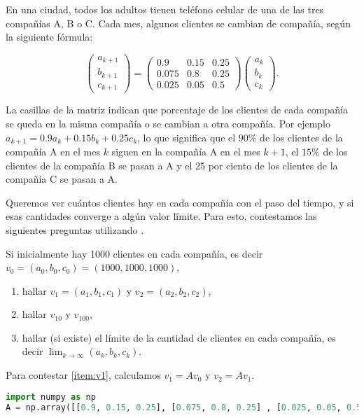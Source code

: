 \begin{ejemplo}
En una ciudad, todos los adultos tienen teléfono celular de una de las
tres compañías A, B o C. Cada mes, algunos clientes se cambian de
compañía, según la siguiente fórmula:

$$
\begin{pmatrix} a_{k+1} \\ b_{k+1} \\ c_{k+1} \end{pmatrix} =
\begin{pmatrix} 0.9 & 0.15 & 0.25 \\ 0.075 & 0.8 & 0.25 \\ 0.025 & 0.05 & 0.5 \end{pmatrix}
\begin{pmatrix} a_{k} \\ b_{k} \\ c_{k} \end{pmatrix}.
$$

La casillas de la matriz indican que porcentaje de los clientes de
cada compañía se queda en la misma compañía o se cambian a otra
compañía.  Por ejemplo $a_{k+1} = 0.9 a_k + 0.15 b_k + 0.25 c_k$, lo que significa que
el $90\%$ de los clientes de la compañía A en el mes
$k$ siguen en la compañía A en el mes $k+1$, el $15\%$ de los clientes de la compañía B se pasan a A y el 25 por ciento de los clientes de la compañía C se pasan a A.

Queremos ver cuántos clientes hay en cada compañía con el paso del tiempo, y si esas cantidades converge a algún valor límite. Para esto, contestamos las siguientes preguntas utilizando \python.

Si inicialmente hay 1000 clientes en cada compañía, es decir
$v_0 = (a_0, b_0, c_0) = (1000, 1000, 1000)$,
\begin{enumerate}
\item\label{item:v1} hallar $v_1 = (a_1, b_1, c_1)$ y $v_2 = (a_2, b_2, c_2)$,
\item  hallar $v_{10}$ y $v_{100}$,
\item  hallar (si existe) el límite de la cantidad de clientes en cada
    compañía, es decir $\lim_{k \rightarrow \infty} (a_k, b_k, c_k)$.
\end{enumerate}

Para contestar \ref{item:v1}, calculamos $v_1 = A v_0$ y $v_2 = A v_1$.

\begin{Shaded}
\begin{lstlisting}[language=python]
import numpy as np
A = np.array([[0.9, 0.15, 0.25], [0.075, 0.8, 0.25] , [0.025, 0.05, 0.5]])


\end{lstlisting}
\end{Shaded}
\end{ejemplo}
